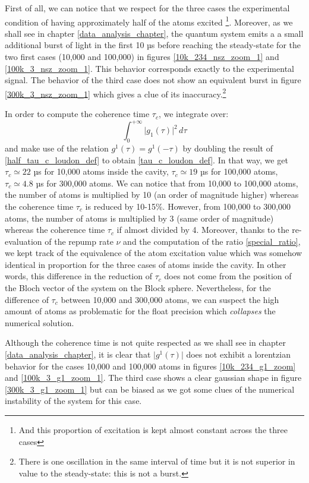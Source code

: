 \documentclass[11pt]{report}
\begin{document}
First of all, we can notice that we respect for the three cases the experimental condition of having approximately half of the atoms excited \footnote{And this proportion of excitation is kept almost constant across the three cases}. Moreover, as we shall see in chapter \ref{data_analysis_chapter}, the quantum system emits a a small additional burst of light in the first 10 µs before reaching the steady-state for the two first cases (10,000 and 100,000) in figures \ref{10k_234_nsz_zoom_1} and \ref{100k_3_nsz_zoom_1}. This behavior corresponds exactly to the experimental signal. The behavior of the third case does not show an equivalent burst in figure \ref{300k_3_nsz_zoom_1} which gives a clue of its inaccuracy.\footnote{There is one oscillation in the same interval of time but it is not superior in value to the steady-state: this is not a burst.}

In order to compute the coherence time $\tau_c$, we integrate over:
\begin{equation}
\label{half_tau_c_loudon_def}
\int_{0}^{+\infty} \vert g_1(\tau) \vert^2 \, d\tau
\end{equation}
and make use of the relation $g^1(\tau)=g^1(-\tau)$ by doubling the result of \ref{half_tau_c_loudon_def} to obtain \ref{tau_c_loudon_def}. In that way, we get $\tau_c \simeq 22$ µs for 10,000 atoms inside the cavity, $\tau_c \simeq 19$ µs for 100,000 atoms, $\tau_c \simeq 4.8$ µs for 300,000 atoms. We can notice that from 10,000 to 100,000 atoms, the number of atoms is multiplied by 10 (an order of magnitude higher) whereas the coherence time $\tau_c$ is reduced by 10-15\%. However, from 100,000 to 300,000 atoms, the number of atoms is multiplied by 3 (same order of magnitude) whereas the coherence time $\tau_c$ if almost divided by 4. Moreover, thanks to the re-evaluation of the repump rate $\nu$ and the computation of the ratio \ref{special_ratio}, we kept track of the equivalence of the atom excitation value which was somehow identical in proportion for the three cases of atoms inside the cavity. In other words, this difference in the reduction of $\tau_c$ does not come from the position of the Bloch vector of the system on the Block sphere. Nevertheless, for the difference of $\tau_c$ between 10,000 and 300,000 atoms, we can suspect the high amount of atoms as problematic for the float precision which \textit{collapses} the numerical solution.

Although the coherence time is not quite respected as we shall see in chapter \ref{data_analysis_chapter}, it is clear that $\vert g^1(\tau) \vert$ does not exhibit a lorentzian behavior for the cases 10,000 and 100,000 atoms in figures \ref{10k_234_g1_zoom} and \ref{100k_3_g1_zoom_1}. The third case shows a clear gaussian shape in figure \ref{300k_3_g1_zoom_1} but can be biased as we got some clues of the numerical instability of the system for this case.
\end{document}
